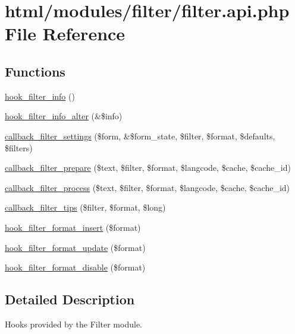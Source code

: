 \hypertarget{filter_8api_8php}{
\section{html/modules/filter/filter.api.php File Reference}
\label{filter_8api_8php}
}
\subsection*{Functions}
\begin{DoxyCompactItemize}
\item 
\hyperlink{group__hooks_gaf2a2f2a46589420df896a0d42247f15a}{hook\_\-filter\_\-info} ()
\item 
\hyperlink{group__hooks_ga7404a5c9b0c1cfe68383ae528bc8ebd4}{hook\_\-filter\_\-info\_\-alter} (\&\$info)
\item 
\hyperlink{group__callbacks_gac9ccfeb3980f8eaa8b3717e98a1e48e2}{callback\_\-filter\_\-settings} (\$form, \&\$form\_\-state, \$filter, \$format, \$defaults, \$filters)
\item 
\hyperlink{group__callbacks_ga28144a42933a1bd6c183e758583f1039}{callback\_\-filter\_\-prepare} (\$text, \$filter, \$format, \$langcode, \$cache, \$cache\_\-id)
\item 
\hyperlink{group__callbacks_ga5f82accd878d144a22ea2dfec253f91d}{callback\_\-filter\_\-process} (\$text, \$filter, \$format, \$langcode, \$cache, \$cache\_\-id)
\item 
\hyperlink{group__callbacks_gabe5ee7c795e0adac0bccb8061006949e}{callback\_\-filter\_\-tips} (\$filter, \$format, \$long)
\item 
\hyperlink{group__hooks_ga3729c44379f4e5298c067795e9aca481}{hook\_\-filter\_\-format\_\-insert} (\$format)
\item 
\hyperlink{group__hooks_gaf9e4490f3ca224c161481754a3332c92}{hook\_\-filter\_\-format\_\-update} (\$format)
\item 
\hyperlink{group__hooks_gae4873bf6d76c33475296917d304719e9}{hook\_\-filter\_\-format\_\-disable} (\$format)
\end{DoxyCompactItemize}


\subsection{Detailed Description}
Hooks provided by the Filter module. 